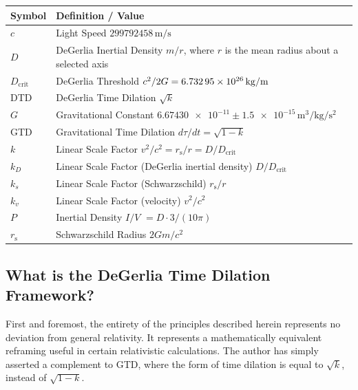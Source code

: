 \documentclass[twoside,twocolumn,9pt,fleqn]{article}
\begin{document}
\noindent
\begin{tabular}{@{}l p{6.7cm}@{}}
\toprule
Symbol & Definition / Value \\
\midrule
$c$ & Light Speed $\num{299792458}\,\unit{\meter\per\second}$ \\
$D$ & DeGerlia Inertial Density $m/r$, where $r$ is the mean radius about a selected axis \\
$D_{\mathrm{crit}}$ & DeGerlia Threshold $c^2/2G = \num{6.73295e26}\,\unit[per-mode=symbol]{\kilogram\per\meter}$ \\
DTD & DeGerlia Time Dilation $\sqrt{k}$  \\
$G$ & Gravitational Constant $\num{6.67430e-11} \pm \num{1.5e-15}\,\unit{\meter\cubed\per\kilogram\per\second\squared}$ \\
GTD & Gravitational Time Dilation $d\tau/dt = \sqrt{1-k}$ \\
$k$ & Linear Scale Factor $v^2/c^2=r_{\mathrm{s}}/r=D/D_{\mathrm{crit}}$ \\
$k_{D}$ & Linear Scale Factor (DeGerlia inertial density) $D/D_{\mathrm{crit}}$ \\
$k_{s}$ & Linear Scale Factor (Schwarzschild) $r_{\mathrm{s}}/r$ \\
$k_{v}$ & Linear Scale Factor (velocity) $v^2/c^2$ \\
$P$ & Inertial Density $I/V$ $=D\cdot 3/(10\pi)$ \\
$r_{\mathrm{s}}$ & Schwarzschild Radius $2Gm/c^2$  \\
\bottomrule
\end{tabular}

\subsection{What is the DeGerlia Time Dilation Framework?}

First and foremost, the entirety of the principles described herein represents no deviation from general relativity. It represents a mathematically equivalent reframing useful in certain relativistic calculations. The author has simply asserted a complement to GTD, where the form of time dilation is equal to $\sqrt{k}$, instead of $\sqrt{1-k}$.
\end{document}
